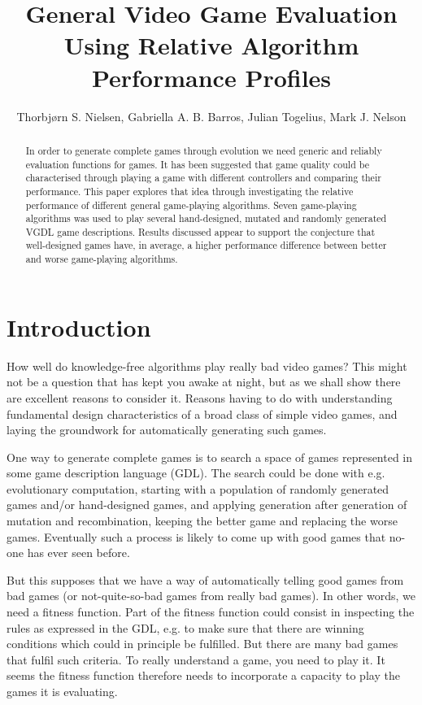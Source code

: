 \documentclass{llncs}
\title{General Video Game Evaluation Using Relative Algorithm Performance Profiles}
\author{
Thorbjørn S. Nielsen, Gabriella A. B. Barros, Julian Togelius, Mark J. Nelson\\
}
\institute{
Center for Computer Games Research, IT University of Copenhagen, Denmark
}
\begin{document}
\maketitle

\begin{abstract}
In order to generate complete games through evolution we need generic and reliably evaluation functions for games. It has been suggested that game quality could be characterised through playing a game with different controllers and comparing their performance. This paper explores that idea through investigating the relative performance of different general game-playing algorithms. Seven game-playing algorithms was used to play several hand-designed, mutated and randomly generated VGDL game descriptions. Results discussed appear to support the conjecture that well-designed games have, in average, a higher performance difference between better and worse game-playing algorithms.
\end{abstract}


\section{Introduction}
How well do knowledge-free algorithms play really bad video games? This might not be a question that has kept you awake at night, but as we shall show there are excellent reasons to consider it. Reasons having to do with understanding fundamental design characteristics of a broad class of simple video games, and laying the groundwork for automatically generating such games.

One way to generate complete games is to search a space of games represented in some game description language (GDL). The search could be done with e.g. evolutionary computation, starting with a population of randomly generated games and/or hand-designed games, and applying generation after generation of mutation and recombination, keeping the better game and replacing the worse games. Eventually such a process is likely to come up with good games that no-one has ever seen before.

But this supposes that we have a way of automatically telling good games from bad games (or not-quite-so-bad games from really bad games). In other words, we need a fitness function. Part of the fitness function could consist in inspecting the rules as expressed in the GDL, e.g. to make sure that there are winning conditions which could in principle be fulfilled. But there are many bad games that fulfil such criteria. To really understand a game, you need to play it. It seems the fitness function therefore needs to incorporate a capacity to play the games it is evaluating.
\end{document}
